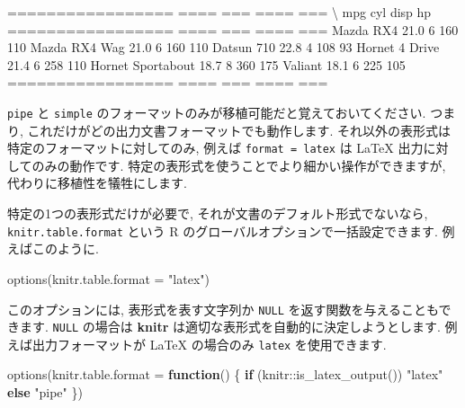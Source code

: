 \documentclass[
  11pt,
  lualatex,
  ja=standard]{bxjsreport}
\newenvironment{Shaded}{\begin{snugshade}}{\end{snugshade}}
\newcommand{\AttributeTok}[1]{\textcolor[rgb]{0.77,0.63,0.00}{#1}}
\newcommand{\ControlFlowTok}[1]{\textcolor[rgb]{0.13,0.29,0.53}{\textbf{#1}}}
\newcommand{\FunctionTok}[1]{\textcolor[rgb]{0.00,0.00,0.00}{#1}}
\newcommand{\NormalTok}[1]{#1}
\newcommand{\SpecialCharTok}[1]{\textcolor[rgb]{0.00,0.00,0.00}{#1}}
\newcommand{\StringTok}[1]{\textcolor[rgb]{0.31,0.60,0.02}{#1}}
\begin{document}
\begin{Shaded}
\begin{Highlighting}[]
\NormalTok{=================  ====  ===  ====  ===}
\NormalTok{\textbackslash{}                   mpg  cyl  disp   hp}
\NormalTok{=================  ====  ===  ====  ===}
\NormalTok{Mazda RX4          21.0    6   160  110}
\NormalTok{Mazda RX4 Wag      21.0    6   160  110}
\NormalTok{Datsun 710         22.8    4   108   93}
\NormalTok{Hornet 4 Drive     21.4    6   258  110}
\NormalTok{Hornet Sportabout  18.7    8   360  175}
\NormalTok{Valiant            18.1    6   225  105}
\NormalTok{=================  ====  ===  ====  ===}
\end{Highlighting}
\end{Shaded}

\texttt{pipe} と \texttt{simple} のフォーマットのみが移植可能だと覚えておいてください. つまり, これだけがどの出力文書フォーマットでも動作します. それ以外の表形式は特定のフォーマットに対してのみ, 例えば \texttt{format = \textquotesingle{}latex\textquotesingle{}} は LaTeX 出力に対してのみの動作です. 特定の表形式を使うことでより細かい操作ができますが, 代わりに移植性を犠牲にします.

特定の1つの表形式だけが必要で, それが文書のデフォルト形式でないなら, \texttt{knitr.table.format} という R のグローバルオプションで一括設定できます. 例えばこのように.

\begin{Shaded}
\begin{Highlighting}[numbers=left,,]
\FunctionTok{options}\NormalTok{(}\AttributeTok{knitr.table.format =} \StringTok{"latex"}\NormalTok{)}
\end{Highlighting}
\end{Shaded}

このオプションには, 表形式を表す文字列か \texttt{NULL} を返す関数を与えることもできます. \texttt{NULL} の場合は \textbf{knitr} は適切な表形式を自動的に決定しようとします. 例えば出力フォーマットが LaTeX の場合のみ \texttt{latex} を使用できます.

\begin{Shaded}
\begin{Highlighting}[numbers=left,,]
\FunctionTok{options}\NormalTok{(}\AttributeTok{knitr.table.format =} \ControlFlowTok{function}\NormalTok{() \{}
  \ControlFlowTok{if}\NormalTok{ (knitr}\SpecialCharTok{::}\FunctionTok{is\_latex\_output}\NormalTok{()) }
    \StringTok{"latex"} \ControlFlowTok{else} \StringTok{"pipe"}
\NormalTok{\})}
\end{Highlighting}
\end{Shaded}
\end{document}
